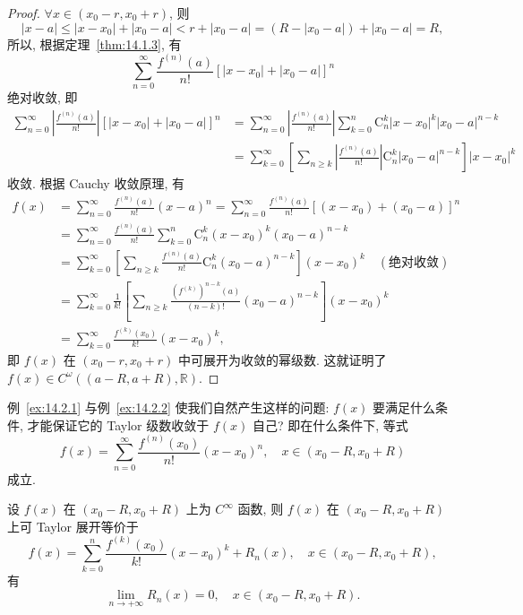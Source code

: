 \begin{proof}
$\forall x\in(x_{0}-r,x_{0}+r)$, 则
\[
  |x-a|\leqslant|x-x_{0}|+|x_{0}-a|<r+|x_{0}-a|=\left(R-|x_{0}-a|\right)+|x_{0}-a|=R,
\]
所以, 根据定理~\ref{thm:14.1.3}, 有
\[
  \sum_{n=0}^{\infty}\frac{f^{(n)}(a)}{n!}[|x-x_{0}|+|x_{0}-a|]^{n}
\]
绝对收敛, 即
\[
  \begin{aligned}
    \sum_{n=0}^{\infty}\left|\frac{f^{(n)}(a)}{n!}\right|[|x-x_{0}|+|x_{0}-a|]^{n}
    &=\sum_{n=0}^{\infty}\left|\frac{f^{(n)}(a)}{n!}\right|\sum_{k=0}^{n}\mathrm{C}_{n}^{k}|x-x_{0}|^{k}|x_{0}-a|^{n-k}\\
    &=\sum_{k=0}^{\infty}\left[\sum_{n\geqslant k}\left|\frac{f^{(n)}(a)}{n!}\right|\mathrm{C}_{n}^{k}|x_{0}-a|^{n-k}\right]|x-x_{0}|^{k}
  \end{aligned}
\]
收敛. 根据 Cauchy 收敛原理, 有
\[
  \begin{aligned}
    f(x)&=\sum_{n=0}^{\infty}\frac{f^{(n)}(a)}{n!}(x-a)^{n}=\sum_{n=0}^{\infty}\frac{f^{(n)}(a)}{n!}[(x-x_{0})+(x_{0}-a)]^{n}\\
    &=\sum_{n=0}^{\infty}\frac{f^{(n)}(a)}{n!}\sum_{k=0}^{n}\mathrm{C}_{n}^{k}(x-x_{0})^{k}(x_{0}-a)^{n-k}\\
    &=\sum_{k=0}^{\infty}\left[\sum_{n\geqslant k}\frac{f^{(n)}(a)}{n!}\mathrm{C}_{n}^{k}(x_{0}-a)^{n-k}\right](x-x_{0})^{k}\quad(\text{绝对收敛})\\
    &=\sum_{k=0}^{\infty}\frac{1}{k!}\left[\sum_{n\geqslant k}\frac{(f^{(k)})^{n-k}(a)}{(n-k)!}(x_{0}-a)^{n-k}\right](x-x_{0})^{k}\\
    &=\sum_{k=0}^{\infty}\frac{f^{(k)}(x_{0})}{k!}(x-x_{0})^{k},
  \end{aligned}
\]
即 $f(x)$ 在 $(x_{0}-r,x_{0}+r)$ 中可展开为收敛的幂级数. 这就证明了 $f(x)\in C^{\omega}((a-R,a+R),\mathbb{R})$.
\end{proof}

例~\ref{ex:14.2.1} 与例~\ref{ex:14.2.2} 使我们自然产生这样的问题: $f(x)$ 要满足什么条件, 才能保证它的 Taylor 级数收敛于 $f(x)$ 自己? 即在什么条件下, 等式
\[
  f(x)=\sum_{n=0}^{\infty}\frac{f^{(n)}(x_{0})}{n!}(x-x_{0})^{n},\quad x\in(x_{0}-R,x_{0}+R)
\]
成立.

\begin{theorem}\label{thm:14.2.4}
设 $f(x)$ 在 $(x_{0}-R,x_{0}+R)$ 上为 $C^{\infty}$ 函数, 则 $f(x)$ 在 $(x_{0}-R,x_{0}+R)$ 上可 Taylor 展开等价于
\[
  f(x)=\sum_{k=0}^{n}\frac{f^{(k)}(x_{0})}{k!}(x-x_{0})^{k}+R_{n}(x),\quad x\in(x_{0}-R,x_{0}+R),
\]
有
\[
  \lim_{n\to+\infty}R_{n}(x)=0,\quad x\in(x_{0}-R,x_{0}+R).
\]
\end{theorem}

